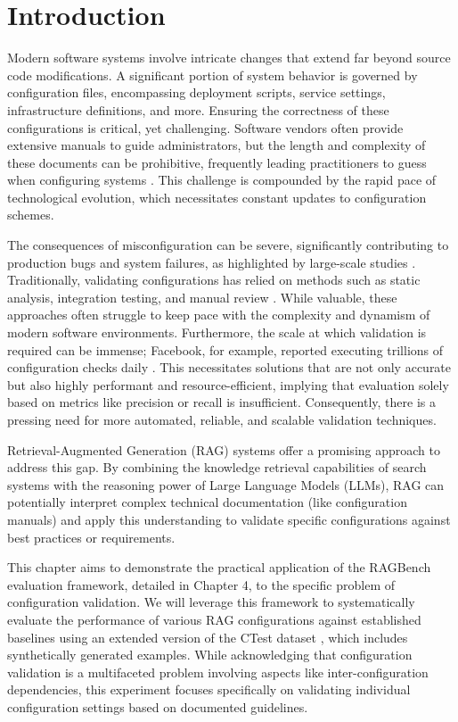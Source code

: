\section{Introduction}
Modern software systems involve intricate changes that extend far beyond source code modifications. A significant portion of system behavior is governed by configuration files, encompassing deployment scripts, service settings, infrastructure definitions, and more. Ensuring the correctness of these configurations is critical, yet challenging. Software vendors often provide extensive manuals to guide administrators, but the length and complexity of these documents can be prohibitive, frequently leading practitioners to guess when configuring systems \cite{Xiang.2020}. This challenge is compounded by the rapid pace of technological evolution, which necessitates constant updates to configuration schemes.

The consequences of misconfiguration can be severe, significantly contributing to production bugs and system failures, as highlighted by large-scale studies \cite{Tang.2015}. Traditionally, validating configurations has relied on methods such as static analysis, integration testing, and manual review \cite{Lian.2024}. While valuable, these approaches often struggle to keep pace with the complexity and dynamism of modern software environments. Furthermore, the scale at which validation is required can be immense; Facebook, for example, reported executing trillions of configuration checks daily \cite{Tang.2015}. This necessitates solutions that are not only accurate but also highly performant and resource-efficient, implying that evaluation solely based on metrics like precision or recall is insufficient. Consequently, there is a pressing need for more automated, reliable, and scalable validation techniques.

Retrieval-Augmented Generation (RAG) systems offer a promising approach to address this gap. By combining the knowledge retrieval capabilities of search systems with the reasoning power of Large Language Models (LLMs), RAG can potentially interpret complex technical documentation (like configuration manuals) and apply this understanding to validate specific configurations against best practices or requirements.

This chapter aims to demonstrate the practical application of the RAGBench evaluation framework, detailed in Chapter 4, to the specific problem of configuration validation. We will leverage this framework to systematically evaluate the performance of various RAG configurations against established baselines using an extended version of the CTest dataset \cite{Lian.2024}, which includes synthetically generated examples. While acknowledging that configuration validation is a multifaceted problem involving aspects like inter-configuration dependencies, this experiment focuses specifically on validating individual configuration settings based on documented guidelines.


